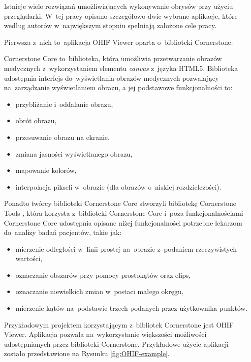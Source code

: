 \documentclass[a4paper,11pt,twoside,openright]{report}
\theoremstyle{definition}
\begin{document}
Istnieje wiele rozwiązań umożliwiających wykonywanie obrysów przy użyciu przeglądarki.
W~tej pracy opisano szczegółowo dwie wybrane aplikacje, które według autorów w~największym
stopniu spełniają założone cele pracy.

Pierwsza z~nich to~aplikacja OHIF Viewer \cite{OHIF Viewer} oparta o~biblioteki Cornerstone.

Cornerstone Core \cite{Cornerstone Core} to~biblioteka, która umożliwia przetwarzanie
obrazów medycznych z~wykorzystaniem elementu \textit{canvas} z~języka HTML5. Biblioteka
udostępnia interfejs do~wyświetlania obrazów medycznych pozwalający na~zarządzanie
wyświetlaniem obrazu, a jej podstawowe funkcjonalności to:

\begin{itemize}[noitemsep]
\item przybliżanie i~oddalanie obrazu,
\item obrót obrazu,
\item przesuwanie obrazu na ekranie,
\item zmiana jasności wyświetlanego obrazu,
\item mapowanie kolorów,
\item interpolacja pikseli w~obrazie (dla obrazów o~niskiej rozdzielczości).
\end{itemize}

Ponadto twórcy biblioteki Cornerstone Core stworzyli bibliotekę Cornerstone Tools \cite{Cornerstone Tools},
która korzysta z~biblioteki Cornerstone Core i~poza funkcjonalnościami
Cornerstone Core udostępnia opisane niżej funkcjonalności
potrzebne lekarzom do~analizy badań pacjentów, takie jak:

\begin{itemize}[noitemsep]
\item mierzenie odległości w~linii prostej na~obrazie z~podaniem rzeczywistych wartości,
\item oznaczanie obszarów przy pomocy prostokątów oraz elips,
\item oznaczanie niewielkich zmian w~postaci małego okręgu,
\item mierzenie kątów na~podstawie trzech podanych przez użytkownika punktów.
\end{itemize}

Przykładowym projektem korzystającym z~bibliotek Cornerstone jest OHIF Viewer.
Aplikacja pozwala na~wykorzystanie większości możliwości udostępnianych przez
biblioteki Cornerstone. Przykładowe użycie aplikacji zostało przedstawione na
Rysunku \ref{fig:OHIF-example}.
\end{document}
